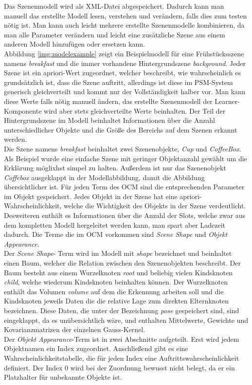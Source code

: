 Das Szenenmodell wird als XML-Datei abgespeichert. Dadurch kann man manuell das erstellte Modell lesen, verstehen und verändern, falls dies zum testen nötig ist. Man kann auch leicht mehrere erstellte Szenenmodelle kombinieren, da man alle Parameter verändern und leicht eine zusätzliche Szene aus einem anderen Modell hinzufügen oder ersetzen kann. \smallskip\\ 
Abbildung \ref{img:modelexample} zeigt ein Beispielmodell für eine Frühstücksszene namens \textit{breakfast} und die immer vorhandene Hintergrundszene \textit{background}. Jeder Szene ist ein apriori-Wert zugeordnet, welcher beschreibt, wie wahrscheinlich es grundsätzlich ist, dass die Szene auftritt, allerdings ist diese im PSM-System generisch gleichverteilt und kommt nur der Vollständigkeit halber vor. Man kann diese Werte falls nötig manuell ändern, das erstellte Szenenmodell der Learner-Komponente wird aber stets gleichverteilte Werte beinhalten. Der Teil der Hintergrundszene im Modell beinhaltet Informationen über die Anzahl unterschiedlicher Objekte und die Größe des Bereichs auf dem Szenen erkannt werden.\smallskip\\
Die Szene namens \textit{breakfast} beinhaltet zwei Szenenobjekte, \textit{Cup} und \textit{CoffeeBox}. Als Beispiel wurde eine einfache Szene mit geringer Objektanzahl gewählt um die Erklärung möglixhst simpel zu halten. Außerdem ist nur das Szenenobjekt \textit{Coffebox} ausgeklappt in der Modellabbildung, damit die Abbildung übersichtlicher ist. Für jeden Term des OCM sind die entsprechenden Parameter im Objekt gespeichert. Jedes Objekt in der Szene hat eine apriori-Wahrscheinlichkeit, welche die Wichtigkeit des Objekts in der Szene verdeutlicht. Desweiteren enthält es Informationen über die Anzahl der Slots, welche zwar aus dem kompletten Modell hergeleitet werden kann, man spart aber Ladezeit dadurch. Die Terme die im OCM vorkommen sind \textit{Scene Shape} und \textit{Objekt Appearance}.\smallskip\\
Der \textit{Scene Shape}- Term wird im Modell mit \textit{shape} bezeichnet und beinhaltet einen Baum, welcher die Relation zwischen den Szenenobjekten beschreibt. Der Baum besteht aus einem Wurzelknoten \textit{root} und beliebig vielen Kindsknoten \textit{child}, welche wiederum Kindsknoten beinhalten können. Der Wurzelknoten enthält das Volumen \textit{volume} auf dem die Erkennung arbeiten soll und die Kindsknoten jeweils Daten die die relative Lage zum direkten Elternknoten bezeichnen. Diese Daten, die unter der Bezeichnung \textit{pose} gespeichert sind, sind eingeklappt, da es unübersichtlich wäre, und enthalten Mittelwerte, Gewichte und Kovarianzmatrizen der einzelnen Gauss-Kernel.\smallskip\\
Der \textit{Objekt Appearance}-Term ist in zwei Abschnitte aufgeteilt. Erst wird jedem Objektnamen ein Index zugeordnet. Anschließend gibt es eine Wahrscheinlichkeitstabelle, die für jeden Index eine Auftrittswahrscheinlichkeit definiert. Der Index 0 wird bei der Zuordnung bewusst nicht belegt, da er ein Platzhalter für unbekannte Objekte ist.
\begin{deprecated}
\cite{gehrung14}
\end{deprecated}

